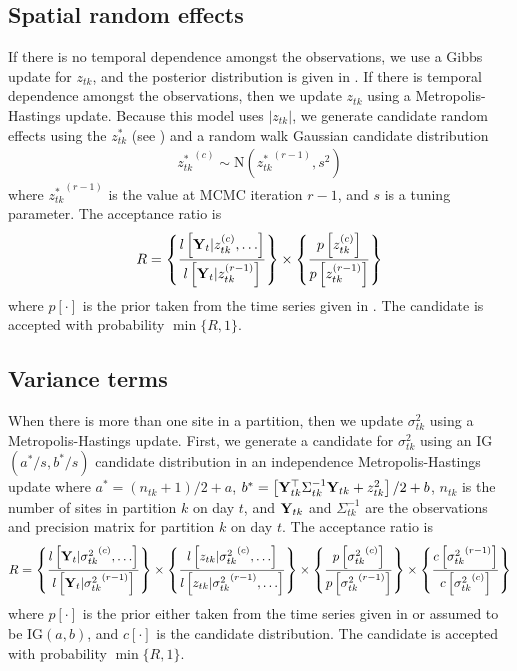 \subsection*{Spatial random effects}

If there is no temporal dependence amongst the observations, we use a Gibbs update for $z_{tk}$, and the posterior distribution is given in .
If there is temporal dependence amongst the observations, then we update $z_{tk}$ using a Metropolis-Hastings update.
Because this model uses $|z_{tk}|$, we generate candidate random effects using the $z^*_{tk}$ (see ) and a random walk Gaussian candidate distribution
\begin{align*}
  {z^*_{tk}}^{(c)} \sim \text{N}({z^*_{tk}}^{(r - 1)}, s^2)
\end{align*}
where ${z^*_{tk}}^{(r-1)}$ is the value at MCMC iteration $r - 1$, and $s$ is a tuning parameter.
The acceptance ratio is
\begin{align*}
  R = \left\{ \frac{ l\left[\mathbf{Y}_t | z_{tk}^{(c)}, \ldots\right] }{ l\left[\mathbf{Y}_t | z_{tk}^{(r - 1)}\right]} \right\} \times \left\{ \frac{ p\left[ z_{tk}^{(c)} \right] }{ p\left[ z_{tk}^{(r - 1)}\right]}\right\}
\end{align*}
where $p[\cdot]$ is the prior taken from the time series given in .
The candidate is accepted with probability $\min\{R, 1\}$.

\subsection*{Variance terms}

When there is more than one site in a partition, then we update $\sigma^2_{tk}$ using a Metropolis-Hastings update.
First, we generate a candidate for $\sigma^2_{tk}$ using an IG$(a^*/s, b^*/s)$ candidate distribution in an independence Metropolis-Hastings update where $a^* = (n_{tk} + 1) / 2 + a$, $b^* = \left[\mathbf{Y}_{tk}^\top \Sigma^{-1}_{tk} \mathbf{Y}_{tk} + z_{tk}^2\right] / 2 + b$, $n_{tk}$ is the number of sites in partition $k$ on day $t$, and $\mathbf{Y}_{tk}$ and $\Sigma^{-1}_{tk}$ are the observations and precision matrix for partition $k$ on day $t$.
The acceptance ratio is
\begin{align*}
  R = \left\{
    \frac{ l\left[\mathbf{Y}_t | {\sigma^2_{tk}}^{(c)}, \ldots\right] }
         { l\left[\mathbf{Y}_t | {\sigma^2_{tk}}^{(r - 1)}\right]}
    \right\} \times \left\{
    \frac{ l\left[z_{tk} | {\sigma^2_{tk}}^{(c)}, \ldots\right] }
         { l\left[z_{tk} | {\sigma^2_{tk}}^{(r - 1)}, \ldots\right] }
    \right\} \times \left\{
    \frac{ p\left[ {\sigma^2_{tk}}^{(c)} \right] }
         { p\left[ {\sigma^2_{tk}}^{(r - 1)}\right] }
    \right\} \times \left\{
    \frac{ c\left[ {\sigma^2_{tk}}^{(r - 1)}\right] }
         { c\left[ {\sigma^2_{tk}}^{(c)}\right]}
    \right\}
\end{align*}
where $p[\cdot]$ is the prior either taken from the time series given in  or assumed to be IG$(a, b)$, and $c[\cdot]$ is the candidate distribution.
The candidate is accepted with probability $\min\{R, 1\}$.

